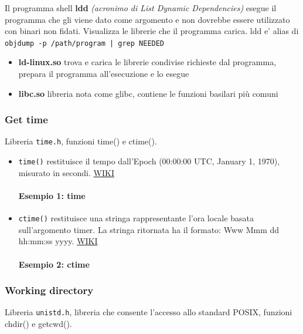 Il programma shell \textbf{ldd} \textit{(acronimo di List Dynamic Dependencies)} esegue il programma che gli viene dato come argomento e non dovrebbe essere utilizzato con binari non fidati. Visualizza le librerie che il programma carica. ldd e' alias di \texttt{objdump -p /path/program | grep NEEDED}

\begin{itemize}
  \item \textbf{ld-linux.so} trova e carica le librerie condivise richieste dal programma, prepara il programma all'esecuzione e lo esegue
  \item \textbf{libc.so} libreria nota come glibc, contiene le funzioni basilari più comuni
\end{itemize}

\subsubsection{Get time}
Libreria \texttt{time.h}, funzioni time() e ctime().
\begin{itemize}
    \item \texttt{time()} restituisce il tempo dall'Epoch (00:00:00 UTC, January 1, 1970), misurato in secondi. \href{https://www.tutorialspoint.com/c_standard_library/c_function_time.htm}{WIKI}
    
    \paragraph{Esempio 1: time} \hfill\break
    

    \item \texttt{ctime()} restituisce una stringa rappresentante l'ora locale basata sull'argomento timer. La stringa ritornata ha il formato: Www Mmm dd hh:mm:ss yyyy. \href{https://www.tutorialspoint.com/c_standard_library/c_function_ctime.htm}{WIKI}
    
    \paragraph{Esempio 2: ctime} \hfill\break
    

\end{itemize}

\subsubsection{Working directory}
Libreria \texttt{unistd.h}, libreria che consente l'accesso allo standard POSIX, funzioni chdir() e getcwd().

